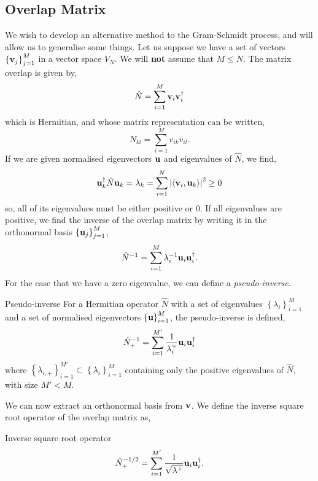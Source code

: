 \documentclass{book}
\def\innerproduct#1#2{{\langle #1},{#2 \rangle}}
\begin{document}
\subsection{Overlap Matrix}
We wish to develop an alternative method to the Gram-Schmidt process, and will allow us to generalise some things. Let us suppose we have a set of vectors $\left\{\vb{v}_j\right\}_{j=1}^M$ in a vector space $V_N$. We will \textbf{not} assume that $M \leq N$. The matrix overlap is given by,
\begin{equation}
	\hat{N} = \sum_{i=1}^M\vb{v}_i\vb{v}_i^{\dag}
\end{equation}
which is Hermitian, and whose matrix representation can be written,
\begin{equation}
	N_{kl} = \sum_{i=1}^Mv_{ik}\overline{v}_{il}.
\end{equation}
If we are given normalised eigenvectors $\vb{u}$ and eigenvalues of $\hat{N}$, we find,
\begin{equation}
	\vb{u}_k^{\dag}\hat{N}\vb{u}_k = \lambda_k = \sum_{i=1}^N\abs{\innerproduct{\vb{v}_i}{\vb{u}_k}}^2 \geq 0
\end{equation}
so, all of its eigenvalues must be either positive or 0. If all eigenvalues are positive, we find the inverse of the overlap matrix by writing it in the orthonormal basis $\left\{\vb{u}_j\right\}_{j=1}^M$,
\begin{equation}
	\hat{N}^{-1} = \sum_{i=1}^M\lambda_i^{-1}\vb{u}_i\vb{u}_i^{\dag}.
\end{equation}
For the case that we have a zero eigenvalue, we can define a \textit{pseudo-inverse}.
\begin{Definitions}{Pseudo-inverse}{}
	For a Hermitian operator $\hat{N}$ with a set of eigenvalues $\left\{\lambda_i\right\}_{i=1}^{M}$ and a set of normalised eigenvectors $\left\{\vb{u}\right\}_{i=1}^M$, the pseudo-inverse is defined,
	\begin{equation}
		\hat{N}_{+}^{-1} = \sum_{i=1}^{M'}\frac{1}{\lambda_{i}^+}\vb{u}_i\vb{u}_i^{\dag}
	\end{equation}
	where $\left\{\lambda_{i,+}\right\}_{i=1}^{M'} \subset \left\{\lambda_i\right\}_{i=1}^{M}$ containing only the positive eigenvalues of $\hat{N}$, with size $M' < M$.
\end{Definitions}
We can now extract an orthonormal basis from $\vb{v}$. We define the inverse square root operator of the overlap matrix as,
\begin{Definitions}{Inverse square root operator}{}
	\begin{equation}
		\hat{N}_{+}^{-1/2} = \sum_{i=1}^{M'}\frac{1}{\sqrt{\lambda^+}}\vb{u}_i\vb{u}_i^{\dag}.
	\end{equation}
\end{Definitions}
\end{document}
